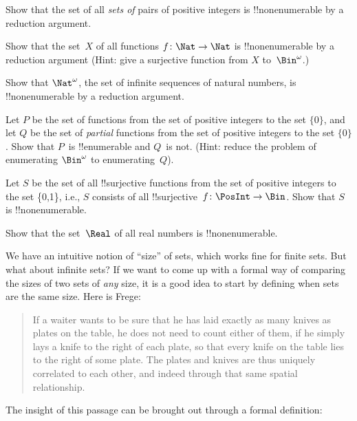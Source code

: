 \begin{prob}
Show that the set of all \emph{sets of} pairs of positive integers is
!!{nonenumerable} by a reduction argument.
\end{prob}

\begin{prob}\label{sfr:siz:red:prob:nat-nat}
  Show that the set~$X$ of all functions $f\colon \Nat \to \Nat$ is
  !!{nonenumerable} by a reduction argument (Hint: give a surjective
  function from $X$ to~$\Bin^\omega$.)
\end{prob}

\begin{prob}
Show that $\Nat^\omega$, the set of infinite sequences of
natural numbers, is !!{nonenumerable} by a reduction argument.
\end{prob}

\begin{prob}
Let $P$ be the set of functions from the set of positive
integers to the set $\{0\}$, and let $Q$ be the set of \emph{partial}
functions from the set of positive integers to the set $\{0\}$. Show
that $P$~is !!{enumerable} and $Q$~is not. (Hint: reduce the problem
of enumerating $\Bin^\omega$ to enumerating~$Q$).
\end{prob}

\begin{prob}
Let $S$ be the set of all !!{surjective} functions from the set of
positive integers to the set \{0,1\}, i.e., $S$ consists of all
!!{surjective}~$f\colon \PosInt \to \Bin$.  Show that $S$ is
!!{nonenumerable}.
\end{prob}

\begin{prob}
Show that the set~$\Real$ of all real numbers is !!{nonenumerable}.
\end{prob}







We have an intuitive notion of ``size'' of sets, which works fine for
finite sets. But what about infinite sets? If we want to come up with
a formal way of comparing the sizes of two sets of \emph{any} size, it
is a good idea to start by defining when sets are the same size. Here
is Frege:
\begin{quote}
  If a waiter wants to be sure that he has laid exactly as many knives
  as plates on the table, he does not need to count either of them, if
  he simply lays a knife to the right of each plate, so that every
  knife on the table lies to the right of some plate. The plates and
  knives are thus uniquely correlated to each other, and indeed
  through that same spatial relationship. \citep[\S70]{Frege1884}
\end{quote}
The insight of this passage can be brought out through a formal
definition:


